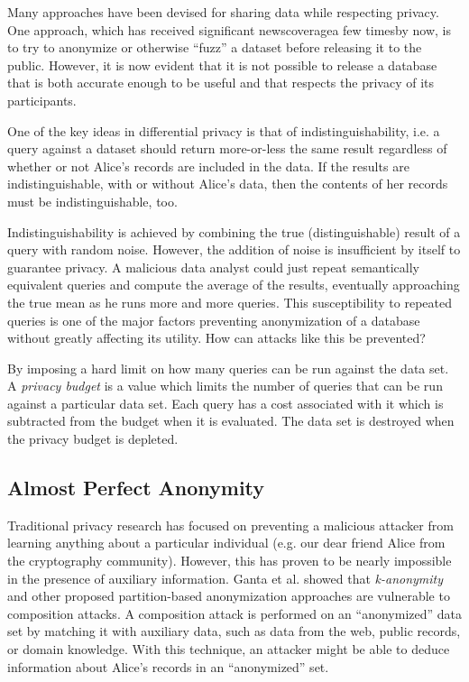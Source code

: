 \documentclass[12pt]{report}
\begin{document}
Many approaches have been devised for sharing data while respecting privacy.
One approach, which has received significant news\footnotemark[\ref{fn:aol}] coverage\footnotemark[\ref{fn:twitter}] a few times\footnotemark[\ref{fn:netflix}] by now\footnotemark[\ref{fn:gic}], is to try to anonymize or otherwise ``fuzz'' a dataset before releasing it to the public.
However, it is now evident that it is not possible to release a database that is both accurate enough to be useful and that respects the privacy of its participants\cite{journals/cacm/Dwork11}.

One of the key ideas in differential privacy is that of indistinguishability, i.e. a query against a dataset should return more-or-less the same result regardless of whether or not Alice's records are included in the data.
If the results are indistinguishable, with or without Alice's data, then the contents of her records must be indistinguishable, too.

Indistinguishability is achieved by combining the true (distinguishable) result of a query with random noise.
However, the addition of noise is insufficient by itself to guarantee privacy.
A malicious data analyst could just repeat semantically equivalent queries and compute the average of the results, eventually approaching the true mean as he runs more and more queries.
This susceptibility to repeated queries is one of the major factors preventing anonymization of a database without greatly affecting its utility.
How can attacks like this be prevented?

By imposing a hard limit on how many queries can be run against the data set.
A \textit{privacy budget} is a value which limits the number of queries that can be run against a particular data set.
Each query has a cost associated with it which is subtracted from the budget when it is evaluated.
The data set is destroyed when the privacy budget is depleted.

\subsection{Almost Perfect Anonymity}

Traditional privacy research has focused on preventing a malicious attacker from learning anything about a particular individual (e.g. our dear friend Alice from the cryptography community).
However, this has proven to be nearly impossible in the presence of auxiliary information.
Ganta et al. showed that \textit{k-anonymity} and other proposed partition-based anonymization approaches are vulnerable to composition attacks\cite{ganta2008composition}.
A composition attack is performed on an ``anonymized'' data set by matching it with auxiliary data, such as data from the web, public records, or domain knowledge.
With this technique, an attacker might be able to deduce information about Alice's records in an ``anonymized'' set.
\end{document}
